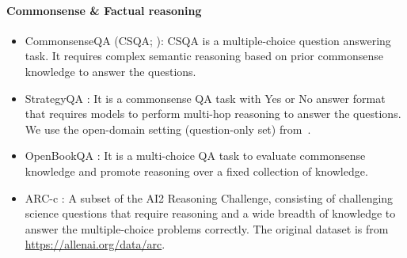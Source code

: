 

\paragraph{Commonsense \& Factual reasoning}
\begin{itemize}
    \item CommonsenseQA (CSQA; \citealp{talmor2019commonsenseqa}):
    CSQA is a multiple-choice question answering task. It requires complex semantic reasoning based on prior commonsense knowledge to answer the questions.

    
    \item StrategyQA \citep{geva2021strategyqa}: It is a commonsense QA task with Yes or No answer format that requires models to perform multi-hop reasoning to answer the questions. We use the open-domain setting (question-only set) from~\citet{srivastava2023bb}.

    \item OpenBookQA
    \citep{mihaylov2018openbookqa}: It is a multi-choice QA task to evaluate commonsense knowledge and promote reasoning over a fixed collection of knowledge. 


    \item ARC-c
    \citep{clark2018think}: A subset of the AI2 Reasoning Challenge, consisting of challenging science questions that require reasoning and a wide breadth of knowledge to answer the multiple-choice problems correctly.
    The original dataset is from \url{https://allenai.org/data/arc}. 


\end{itemize}
